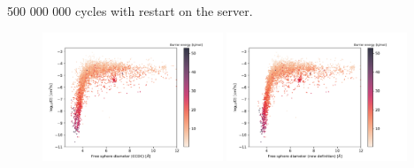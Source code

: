 \documentclass[main]{subfiles}
\begin{document}
500 000 000 cycles with restart on the server.


\begin{figure}[ht]
  \centering
    \includegraphics[width=0.48\textwidth]{figures/5-diffusion/difflog_Df-ccdc_barrier.pdf}
    \includegraphics[width=0.48\textwidth]{figures/5-diffusion/difflog_Df-uff298K_barrier.pdf}
    \caption{}\label{fgr:}
\end{figure}


\end{document}
